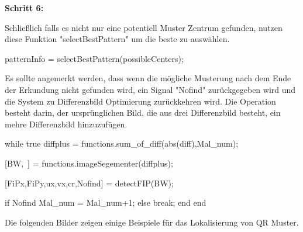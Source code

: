 \textbf{Schritt 6:}

Schließlich falls es nicht nur eine potentiell Muster Zentrum gefunden, nutzen diese Funktion "selectBestPattern" um die beste zu auswählen. 

\singlespacing
\begin{matlab}[firstnumber=1, name=MATLABCodeBeispiel, caption={MATLAB Code Beispiel}, label={lst:MATLABCodeBeispiel}]

patternInfo = selectBestPattern(possibleCenters);

\end{matlab}
\onehalfspacing 

Es sollte angemerkt werden, dass wenn die mögliche Musterung nach dem Ende der Erkundung nicht gefunden wird, ein Signal "Nofind" zurückgegeben wird und die System zu Differenzbild Optimierung zurückkehren wird. Die Operation besteht darin, der ursprünglichen Bild, die aus drei Differenzbild besteht, ein mehre Differenzbild hinzuzufügen.

\singlespacing
\begin{matlab}[firstnumber=1, name=MATLABCodeBeispiel, caption={MATLAB Code Beispiel}, label={lst:MATLABCodeBeispiel}]
while true
diffplus = functions.sum_of_diff(abs(diff),Mal_num);

[BW,~] = functions.imageSegementer(diffplus);

[FiPx,FiPy,ux,vx,cr,Nofind] = detectFIP(BW);

if Nofind
    Mal_num = Mal_num+1;
else 
    break;
end
end
\end{matlab}
\onehalfspacing 

Die folgenden Bilder zeigen einige Beispiele für das Lokalisierung von QR Muster.
